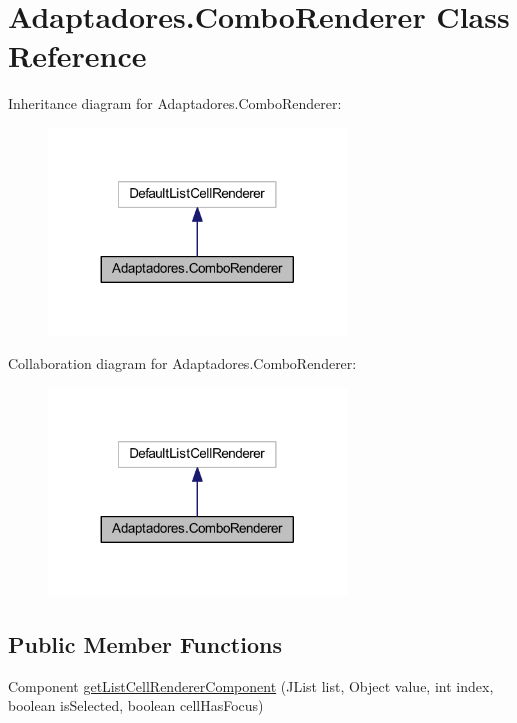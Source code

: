 \hypertarget{class_adaptadores_1_1_combo_renderer}{}\section{Adaptadores.\+Combo\+Renderer Class Reference}
\label{class_adaptadores_1_1_combo_renderer}


Inheritance diagram for Adaptadores.\+Combo\+Renderer\+:\nopagebreak
\begin{figure}[H]
\begin{center}
\leavevmode
\includegraphics[width=224pt]{class_adaptadores_1_1_combo_renderer__inherit__graph}
\end{center}
\end{figure}


Collaboration diagram for Adaptadores.\+Combo\+Renderer\+:\nopagebreak
\begin{figure}[H]
\begin{center}
\leavevmode
\includegraphics[width=224pt]{class_adaptadores_1_1_combo_renderer__coll__graph}
\end{center}
\end{figure}
\subsection*{Public Member Functions}
\begin{DoxyCompactItemize}
\item 
Component \mbox{\hyperlink{class_adaptadores_1_1_combo_renderer_a38d1af7130aec91da8506ba453b14d19}{get\+List\+Cell\+Renderer\+Component}} (J\+List list, Object value, int index, boolean is\+Selected, boolean cell\+Has\+Focus)
\end{DoxyCompactItemize}


